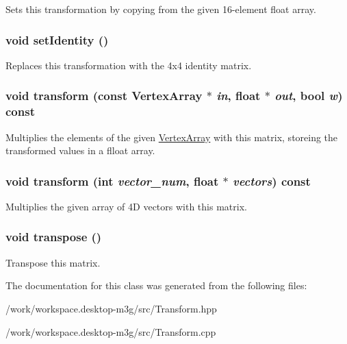Sets this transformation by copying from the given 16-element float array. \hypertarget{classm3g_1_1Transform_382e6ad7e6721b121e510959e1011be3}{
\subsubsection[{setIdentity}]{\setlength{\rightskip}{0pt plus 5cm}void setIdentity ()}}
\label{classm3g_1_1Transform_382e6ad7e6721b121e510959e1011be3}


Replaces this transformation with the 4x4 identity matrix. \hypertarget{classm3g_1_1Transform_930167bb932a1c26c160fa1eece500d3}{
\subsubsection[{transform}]{\setlength{\rightskip}{0pt plus 5cm}void transform (const {\bf VertexArray} $\ast$ {\em in}, \/  float $\ast$ {\em out}, \/  bool {\em w}) const}}
\label{classm3g_1_1Transform_930167bb932a1c26c160fa1eece500d3}


Multiplies the elements of the given \hyperlink{classm3g_1_1VertexArray}{VertexArray} with this matrix, storeing the transformed values in a flloat array. \hypertarget{classm3g_1_1Transform_441599a6e846a344be78571668406619}{
\subsubsection[{transform}]{\setlength{\rightskip}{0pt plus 5cm}void transform (int {\em vector\_\-num}, \/  float $\ast$ {\em vectors}) const}}
\label{classm3g_1_1Transform_441599a6e846a344be78571668406619}


Multiplies the given array of 4D vectors with this matrix. \hypertarget{classm3g_1_1Transform_f3a99ffb20127be48232d12260e934dc}{
\subsubsection[{transpose}]{\setlength{\rightskip}{0pt plus 5cm}void transpose ()}}
\label{classm3g_1_1Transform_f3a99ffb20127be48232d12260e934dc}


Transpose this matrix. 

The documentation for this class was generated from the following files:\begin{CompactItemize}
\item 
/work/workspace.desktop-m3g/src/Transform.hpp\item 
/work/workspace.desktop-m3g/src/Transform.cpp\end{CompactItemize}

